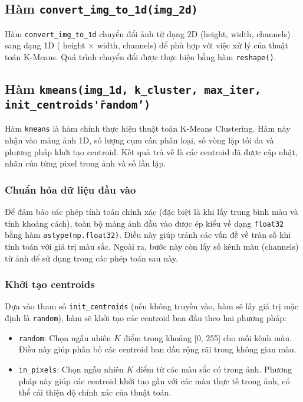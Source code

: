\subsection{Hàm \texttt{convert\_img\_to\_1d(img\_2d)}}

Hàm \texttt{convert\_img\_to\_1d} chuyển đổi ảnh từ dạng 2D (height, width, channels) sang dạng 1D ( height $\times$ width, channels) để phù hợp với việc xử lý của thuật toán K-Means. Quá trình chuyển đổi được thực hiện bằng hàm \texttt{reshape()}.

\subsection{Hàm \texttt{kmeans(img\_1d, k\_cluster, max\_iter, init\_centroids\='random')}}

Hàm \texttt{kmeans} là hàm chính thực hiện thuật toán K-Means Clustering. Hàm này nhận vào mảng ảnh 1D, số lượng cụm cần phân loại, số vòng lặp tối đa và phương pháp khởi tạo centroid. Kết quả trả về là các centroid đã được cập nhật, nhãn của từng pixel trong ảnh và số lần lặp.

\subsubsection{Chuẩn hóa dữ liệu đầu vào}
Để đảm bảo các phép tính toán chính xác (đặc biệt là khi lấy trung bình màu và tính khoảng cách), toàn bộ mảng ảnh đầu vào được ép kiểu về dạng \texttt{float32} bằng hàm \texttt{astype(np.float32)}. Điều này giúp tránh các vấn đề về tràn số khi tính toán với giá trị màu sắc. Ngoài ra, bước này còn lấy số kênh màu (channels) từ ảnh để sử dụng trong các phép toán sau này.

\subsubsection{Khởi tạo centroids}
Dựa vào tham số \texttt{init\_centroids} (nếu không truyền vào, hàm sẽ lấy giá trị mặc định là \texttt{random}), hàm sẽ khởi tạo các centroid ban đầu theo hai phương pháp:
\begin{itemize}
	\item \texttt{random}: Chọn ngẫu nhiên $K$ điểm trong khoảng [0, 255] cho mỗi kênh màu. Điều này giúp phân bố các centroid ban đầu rộng rãi trong không gian màu.
	\item \texttt{in\_pixels}: Chọn ngẫu nhiên $K$ điểm từ các màu sắc có trong ảnh. Phương pháp này giúp các centroid khởi tạo gần với các màu thực tế trong ảnh, có thể cải thiện độ chính xác của thuật toán.
\end{itemize}

